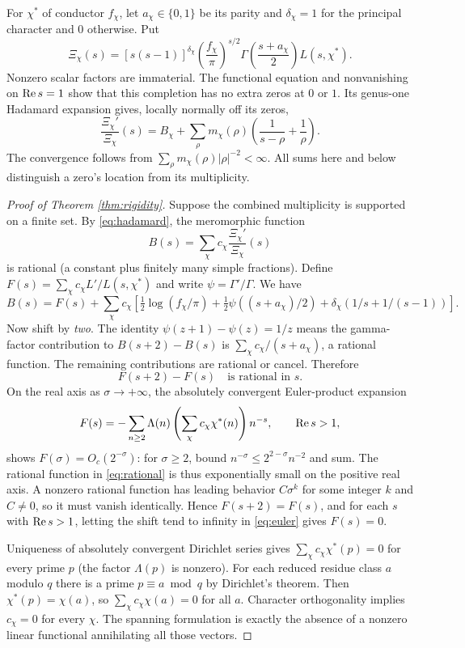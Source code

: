 \documentclass[11pt]{article}
\begin{document}
For $\chi^*$ of conductor $f_\chi$, let $a_\chi\in\{0,1\}$ be its parity and $\delta_\chi=1$ for the principal character and $0$ otherwise. Put
\[
 \Xi_\chi(s)=[s(s-1)]^{\delta_\chi}
 \left(\frac{f_\chi}{\pi}\right)^{s/2}
 \Gamma\left(\frac{s+a_\chi}{2}\right)L(s,\chi^*).
\]
Nonzero scalar factors are immaterial. The functional equation and nonvanishing on $\operatorname{Re} s=1$ show that this completion has no extra zeros at $0$ or $1$. Its genus-one Hadamard expansion gives, locally normally off its zeros,
\begin{equation}\label{eq:hadamard}
 \frac{\Xi_\chi'}{\Xi_\chi}(s)=B_\chi+
 \sum_{\rho}m_\chi(\rho)\left(\frac1{s-\rho}+\frac1\rho\right).
\end{equation}
The convergence follows from $\sum_\rho m_\chi(\rho)|\rho|^{-2}<\infty$. All sums here and below distinguish a zero's location from its multiplicity.

\begin{proof}[Proof of Theorem \ref{thm:rigidity}]
Suppose the combined multiplicity is supported on a finite set. By \eqref{eq:hadamard}, the meromorphic function
\[
 B(s)=\sum_\chi c_\chi\frac{\Xi_\chi'}{\Xi_\chi}(s)
\]
is rational (a constant plus finitely many simple fractions). Define $F(s)=\sum_\chi c_\chi L'/L(s,\chi^*)$ and write $\psi=\Gamma'/\Gamma$. We have
\[
 B(s)=F(s)+\sum_\chi c_\chi\left[
 \tfrac12\log(f_\chi/\pi)+\tfrac12\psi((s+a_\chi)/2)
 +\delta_\chi(1/s+1/(s-1))\right].
\]
Now shift by \emph{two}. The identity $\psi(z+1)-\psi(z)=1/z$ means the gamma-factor contribution to $B(s+2)-B(s)$ is $\sum_\chi c_\chi/(s+a_\chi)$, a rational function. The remaining contributions are rational or cancel. Therefore
\begin{equation}\label{eq:rational}
 F(s+2)-F(s)\quad\text{is rational in }s.
\end{equation}
On the real axis as $\sigma\to+\infty$, the absolutely convergent Euler-product expansion
\begin{equation}\label{eq:euler}
 F(s)=-\sum_{n\ge2}\Lambda(n)\left(\sum_\chi c_\chi\chi^*(n)\right)n^{-s},\qquad\operatorname{Re} s>1,
\end{equation}
shows $F(\sigma)=O_c(2^{-\sigma})$: for $\sigma\ge2$, bound $n^{-\sigma}\le 2^{2-\sigma}n^{-2}$ and sum. The rational function in \eqref{eq:rational} is thus exponentially small on the positive real axis. A nonzero rational function has leading behavior $C\sigma^k$ for some integer $k$ and $C\ne0$, so it must vanish identically. Hence $F(s+2)=F(s)$, and for each $s$ with $\operatorname{Re} s>1$, letting the shift tend to infinity in \eqref{eq:euler} gives $F(s)=0$.

Uniqueness of absolutely convergent Dirichlet series gives $\sum_\chi c_\chi\chi^*(p)=0$ for every prime $p$ (the factor $\Lambda(p)$ is nonzero). For each reduced residue class $a$ modulo $q$ there is a prime $p\equiv a\bmod q$ by Dirichlet's theorem. Then $\chi^*(p)=\chi(a)$, so $\sum_\chi c_\chi\chi(a)=0$ for all $a$. Character orthogonality implies $c_\chi=0$ for every $\chi$. The spanning formulation is exactly the absence of a nonzero linear functional annihilating all those vectors.
\end{proof}
\end{document}
